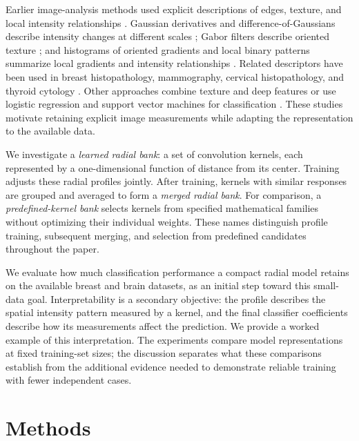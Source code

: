 \documentclass[10pt,twocolumn]{article}
\begin{document}
Earlier image-analysis methods used explicit descriptions of edges, texture, and local intensity relationships \cite{haralick1973,haralick1979}. Gaussian derivatives and difference-of-Gaussians describe intensity changes at different scales \cite{lowe2004}; Gabor filters describe oriented texture \cite{daugman1985}; and histograms of oriented gradients and local binary patterns summarize local gradients and intensity relationships \cite{dalal2005,ojala2002}. Related descriptors have been used in breast histopathology, mammography, cervical histopathology, and thyroid cytology \cite{doyle2008,ojansivu2013,gopinath2013,zheng2010,kadhim2023,he2023}. Other approaches combine texture and deep features \cite{cai2022} or use logistic regression and support vector machines for classification \cite{karuppasamy2024}. These studies motivate retaining explicit image measurements while adapting the representation to the available data.

We investigate a \emph{learned radial bank}: a set of convolution kernels, each represented by a one-dimensional function of distance from its center. Training adjusts these radial profiles jointly. After training, kernels with similar responses are grouped and averaged to form a \emph{merged radial bank}. For comparison, a \emph{predefined-kernel bank} selects kernels from specified mathematical families without optimizing their individual weights. These names distinguish profile training, subsequent merging, and selection from predefined candidates throughout the paper.

We evaluate how much classification performance a compact radial model retains on the available breast and brain datasets, as an initial step toward this small-data goal. Interpretability is a secondary objective: the profile describes the spatial intensity pattern measured by a kernel, and the final classifier coefficients describe how its measurements affect the prediction. We provide a worked example of this interpretation. The experiments compare model representations at fixed training-set sizes; the discussion separates what these comparisons establish from the additional evidence needed to demonstrate reliable training with fewer independent cases.

\section{Methods}
\end{document}
